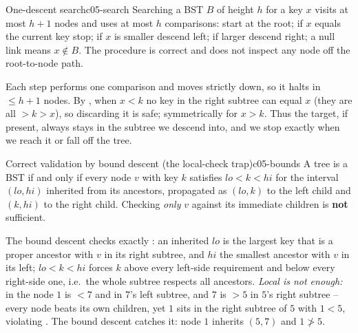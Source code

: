 \begin{proposition}{One-descent search}{c05-search}
Searching a BST $B$ of height $h$ for a key $x$ visits at most $h+1$ nodes and uses at most $h$
comparisons: start at the root; if $x$ equals the current key stop; if $x$ is smaller descend left;
if larger descend right; a null link means $x\notin B$. The procedure is correct and does not inspect
any node off the root-to-node path.
\end{proposition}
\begin{proofbox}
Each step performs one comparison and moves strictly down, so it halts in $\le h+1$ nodes. By
, when $x<k$ no key in the right subtree can equal $x$ (they are all $>k>x$), so
discarding it is safe; symmetrically for $x>k$. Thus the target, if present, always stays in the
subtree we descend into, and we stop exactly when we reach it or fall off the tree. \end{proofbox}

\begin{theorem}{Correct validation by bound descent (the local-check trap)}{c05-bounds}
A tree is a BST if and only if every node $v$ with key $k$ satisfies $\mathit{lo}<k<\mathit{hi}$ for
the interval $(\mathit{lo},\mathit{hi})$ inherited from its ancestors, propagated as
$(\mathit{lo},k)$ to the left child and $(k,\mathit{hi})$ to the right child. Checking
\emph{only} $v$ against its immediate children is \textbf{not} sufficient.
\end{theorem}
\begin{proofbox}
The bound descent checks exactly : an inherited $\mathit{lo}$ is the largest key
that is a proper ancestor with $v$ in its right subtree, and $\mathit{hi}$ the smallest ancestor with
$v$ in its left; $\mathit{lo}<k<\mathit{hi}$ forces $k$ above every left-side requirement and below
every right-side one, i.e.\ the whole subtree respects all ancestors. \emph{Local is not enough:}
in  the node $1$ is $<7$ and in $7$'s left subtree, and $7$ is $>5$ in $5$'s right
subtree -- every node beats its own children, yet $1$ sits in the right subtree of $5$ with $1<5$,
violating . The bound descent catches it: node $1$ inherits $(5,7)$ and $1\not>5$.
\end{proofbox}


